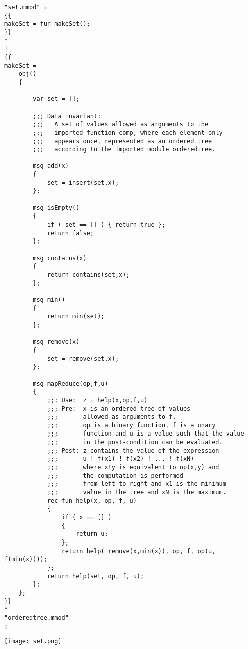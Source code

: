 \documentclass{article}
\begin{document}
\begin{verbatim}
"set.mmod" =
{{
makeSet = fun makeSet();
}}
*
!
{{
makeSet =
    obj()
    {
    
        var set = [];
        
        ;;; Data invariant:
        ;;;   A set of values allowed as arguments to the
        ;;;   imported function comp, where each element only
        ;;;   appears once, represented as an ordered tree 
        ;;;   according to the imported module orderedtree.
        
        msg add(x)
        {
            set = insert(set,x);
        };
        
        msg isEmpty()
        {
            if ( set == [] ) { return true };
            return false;
        };
        
        msg contains(x)
        {
            return contains(set,x);
        };
        
        msg min()
        {
            return min(set);
        };
        
        msg remove(x)
        {
            set = remove(set,x);
        };
        
        msg mapReduce(op,f,u)
        {
            ;;; Use:  z = help(x,op,f,u)
            ;;; Pre:  x is an ordered tree of values 
            ;;;       allowed as arguments to f.
            ;;;       op is a binary function, f is a unary
            ;;;       function and u is a value such that the value
            ;;;       in the post-condition can be evaluated.
            ;;; Post: z contains the value of the expression 
            ;;;       u ! f(x1) ! f(x2) ! ... ! f(xN)
            ;;;       where x!y is equivalent to op(x,y) and
            ;;;       the computation is performed
            ;;;       from left to right and x1 is the minimum
            ;;;       value in the tree and xN is the maximum.
            rec fun help(x, op, f, u)
            {
                if ( x == [] )
                {
                    return u;
                };
                return help( remove(x,min(x)), op, f, op(u, f(min(x))));
            };
            return help(set, op, f, u);
        };
    };
}}
*
"orderedtree.mmod"
;
	\end{verbatim}
	\begin{center}
		\texttt{[image: set.png]}
	\end{center}
	
\end{document}
